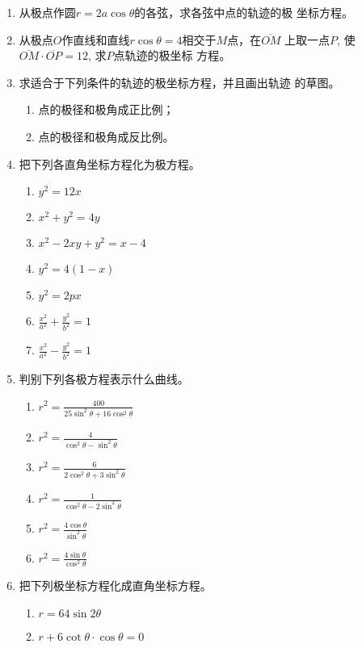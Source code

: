 \begin{enumerate}
    \item 从极点作圆$r=2a\cos\theta$的各弦，求各弦中点的轨迹的极
    坐标方程。
    \item 从极点$O$作直线和直线$r\cos\theta=4$相交于$M$点，在$\overline{OM}$
    上取一点$P$, 使$\overline{OM}\cdot\overline{OP}=12$, 求$P$点轨迹的极坐标
    方程。
    \item 求适合于下列条件的轨迹的极坐标方程，并且画出轨迹
    的草图。
\begin{enumerate}
    \item 点的极径和极角成正比例；
    \item 点的极径和极角成反比例。
\end{enumerate}
\item 把下列各直角坐标方程化为极方程。
\begin{multicols}{2}
\begin{enumerate}
    \item $y^2=12x$
    \item $x^2+y^2=4y$
    \item $x^2-2xy+y^2=x-4$
    \item $y^2=4(1-x)$
    \item $y^2=2px$
    \item $\frac{x^2}{a^2}+\frac{y^2}{b^2}=1$
    \item $\frac{x^2}{a^2}-\frac{y^2}{b^2}=1$
\end{enumerate}
\end{multicols}
\item 判别下列各极方程表示什么曲线。
\begin{multicols}{2}
    \begin{enumerate}
    \item $r^2=\frac{400}{25\sin^2\theta+16\cos^2\theta}$
    \item $r^2=\frac{4}{\cos^2\theta-\sin^2\theta}$
    \item $r^2=\frac{6}{2\cos^2\theta+3\sin^2\theta}$
    \item $r^2=\frac{1}{\cos^2\theta-2\sin^2\theta}$
    \item $r^2=\frac{4\cos\theta}{\sin^2\theta}$
    \item $r^2=\frac{4\sin\theta}{\cos^2\theta}$
\end{enumerate}
\end{multicols}

\item 把下列极坐标方程化成直角坐标方程。
\begin{multicols}{2}
\begin{enumerate}
    \item $r=64\sin2\theta$
    \item $r+6\cot\theta\cdot \cos\theta=0$
\end{enumerate}
\end{multicols}

\end{enumerate}


